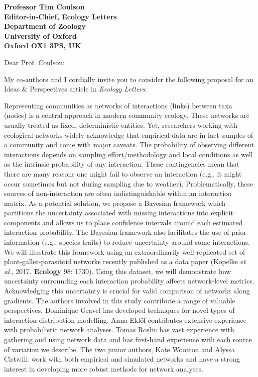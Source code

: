 \documentclass[12pt]{letter}
\newcommand{\myjournal}{\emph{Ecology Letters}}
\begin{document}
\begin{letter}{\bf Professor Tim Coulson\\
               Editor-in-Chief, Ecology Letters\\
               Department of Zoology\\
               University of Oxford\\
               Oxford OX1 3PS, UK
                               }


\opening{Dear Prof. Coulson:}

    My co-authors and I cordially invite you to consider the 
    following proposal for an Ideas \& Perspectives article in 
    \myjournal:


    Representing communities as networks of interactions (links) between taxa (nodes) is a central approach in modern community ecology. These networks are usually treated as fixed, deterministic entities. Yet, researchers working with ecological networks widely acknowledge that empirical data are in fact samples of a community and come with major caveats. The probability of observing different interactions depends on sampling effort/methodology and local conditions as well as the intrinsic probability of any interaction. These contingencies mean that there are many reasons one might fail to observe an interaction (e.g., it might occur sometimes but not during sampling due to weather). Problematically, these sources of non-interaction are often indistinguishable within an interaction matrix. As a potential solution, we propose a Bayesian framework which partitions the uncertainty associated with missing interactions into explicit components and allows us to place confidence intervals around each estimated interaction probability. The Bayesian framework also facilitates the use of prior information (e.g., species traits) to reduce uncertainty around some interactions. We will illustrate this framework using an extraordinarily  well-replicated set of plant-galler-parasitoid networks recently published as a data paper (Kopelke \emph{et al.}, 2017. \textbf{Ecology} 98: 1730). Using this dataset, we will demonstrate how uncertainty surrounding each interaction probability affects network-level metrics. Acknowledging this uncertainty is crucial for valid comparison of networks along gradients. The authors involved in this study contribute a range of valuable perspectives. Dominique Gravel has developed techniques for novel types of interaction distribution modelling. Anna Ekl\"{o}f contributes extensive experience with probabilistic network analyses. Tomas Roslin has vast experience with gathering and using network data and has first-hand experience with each source of variation we describe. The two junior authors, Kate Wootton and Alyssa Cirtwill, work with both empirical and simulated networks and have a strong interest in developing more robust methods for network analyses.


\end{letter}
\end{document}
